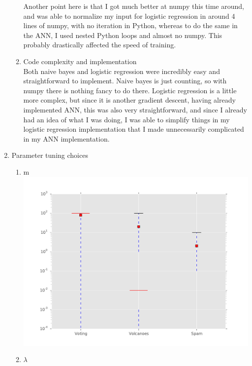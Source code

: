 \documentclass[12pt]{article}
\begin{document}
\begin{enumerate}
\begin{enumerate}
                Another point here is that I got much better at numpy this time
                around, and was able to normalize my input for logistic
                regression in around 4 lines of numpy, with no iteration in
                Python, whereas to do the same in the ANN, I used nested Python
                loops and almost no numpy. This probably drastically affected
                the speed of training.
            \item Code complexity and implementation\\
                Both naive bayes and logistic regression were incredibly
                easy and straightforward to implement. Naive bayes is just
                counting, so with numpy there is nothing fancy to do there.
                Logistic regression is a little more complex, but since it is
                another gradient descent, having already implemented ANN, this
                was also very straightforward, and since I already had an idea
                of what I was doing, I was able to simplify things in my
                logistic regression implementation that I made unnecessarily
                complicated in my ANN implementation.
        \end{enumerate}
    \item Parameter tuning choices\\
        \begin{enumerate}
            \item m\\
                \includegraphics[width=\linewidth]{mchoices.pdf}
            \item $\lambda$\\

\end{enumerate}
\end{enumerate}
\end{document}
